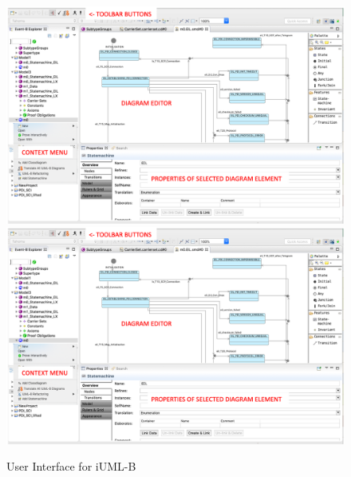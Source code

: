 \begin{figure}[!htbp]
	\centering
	\ifplastex
	\includegraphics[width=1000]{figures/UMLB_UI.png}
	\else
	\includegraphics[width=1\textwidth]{figures/UMLB_UI.png}
	\fi
	\caption{User Interface for iUML-B}
	\label{fig:UMLB_UI}
\end{figure}